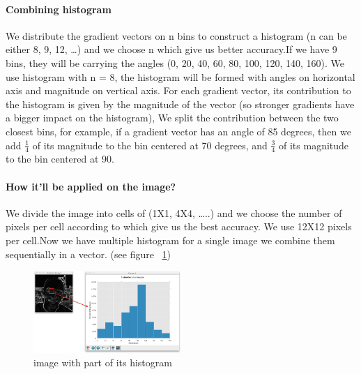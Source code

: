 \paragraph{Combining histogram}
We distribute the gradient vectors on n bins to construct a histogram (n can be either 8, 9, 12, …) and we choose n which give us better accuracy.\newline If we have 9 bins, they will be carrying the angles (0, 20, 40, 60, 80, 100, 120, 140, 160). \newline We use histogram with n = 8, the histogram will be formed with angles on horizontal axis and magnitude on vertical axis.
\newline For each gradient vector, its contribution to the histogram is given by the magnitude of the vector (so stronger gradients have a bigger impact on the histogram), We split the contribution between the two closest bins, for example, if a gradient vector has an angle of 85 degrees, then we add
\begin{math}
    \frac{1}{4}
\end{math} 
of its magnitude to the bin centered at 70 degrees, and 
\begin{math}
    \frac{3}{4} 
\end{math}
of its magnitude to the bin centered at 90.
\paragraph{How it’ll be applied on the image?}We divide the image into cells of (1X1, 4X4, …..) and we choose the number of pixels per cell according to which give us the best accuracy.\newline
We use 12X12 pixels per cell.\newline Now we have multiple histogram for a single image we combine them sequentially in a vector. (see figure ~\ref{fig:hist representation})
\begin{figure}
	\centering
	\includegraphics[width=0.5\textwidth]{images/histogram_ex.png}
	\caption{image with part of its histogram}
	\label{fig:hist representation}
\end{figure}
